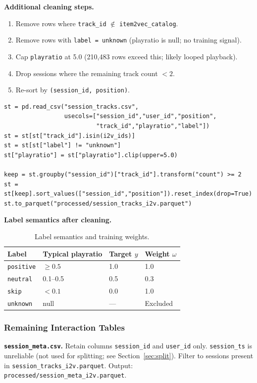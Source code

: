 \documentclass[11pt]{article}
\begin{document}
\textbf{Additional cleaning steps.}
\begin{enumerate}
  \item Remove rows where \texttt{track\_id} $\notin$ \texttt{item2vec\_catalog}.
  \item Remove rows with \texttt{label = unknown} (playratio is null; no training signal).
  \item Cap \texttt{playratio} at 5.0 (210,483 rows exceed this; likely looped playback).
  \item Drop sessions where the remaining track count $< 2$.
  \item Re-sort by \texttt{(session\_id, position)}.
\end{enumerate}

\begin{lstlisting}
st = pd.read_csv("session_tracks.csv",
                 usecols=["session_id","user_id","position",
                          "track_id","playratio","label"])
st = st[st["track_id"].isin(i2v_ids)]
st = st[st["label"] != "unknown"]
st["playratio"] = st["playratio"].clip(upper=5.0)

keep = st.groupby("session_id")["track_id"].transform("count") >= 2
st = st[keep].sort_values(["session_id","position"]).reset_index(drop=True)
st.to_parquet("processed/session_tracks_i2v.parquet")
\end{lstlisting}

\textbf{Label semantics after cleaning.}
\begin{table}[H]
\centering
\caption{Label semantics and training weights.}
\begin{tabular}{llll}
\toprule
\textbf{Label} & \textbf{Typical playratio} & \textbf{Target $y$} & \textbf{Weight $\omega$} \\
\midrule
\texttt{positive} & $\ge 0.5$  & 1.0 & 1.0 \\
\texttt{neutral}  & 0.1--0.5   & 0.5 & 0.3 \\
\texttt{skip}     & $< 0.1$    & 0.0 & 1.0 \\
\texttt{unknown}  & null       & --- & Excluded \\
\bottomrule
\end{tabular}
\end{table}

\subsubsection{Remaining Interaction Tables}

\textbf{\texttt{session\_meta.csv}.}
Retain columns \texttt{session\_id} and \texttt{user\_id} only.
\texttt{session\_ts} is unreliable (not used for splitting; see Section~\ref{sec:split}).
Filter to sessions present in \texttt{session\_tracks\_i2v.parquet}.
Output: \texttt{processed/session\_meta\_i2v.parquet}.
\end{document}

